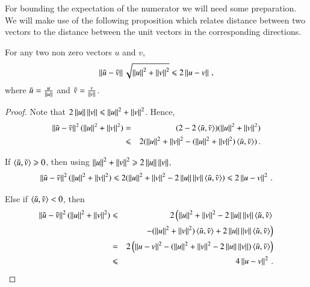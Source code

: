 \documentclass[11pt]{article}
\begin{document}
For bounding the expectation of the numerator we will need some preparation. We will make use of the
following proposition which relates distance between two vectors to the distance between the unit vectors in the corresponding directions.
\begin{proposition}
\label{prop:2vecs}
For any two non zero vectors $u$ and $v$, 
\[ \norm{\tilde{u} - \tilde{v}}  \sqrt{ \norm{u}^2 + \norm{v}^2 }
  \leq 2 \norm{u - v}  \mcom \]
  where $\tilde{u} = \frac{u}{\norm{u}}$ and $\tilde{v} =
  \frac{v}{\norm{v}}$.
\end{proposition}
\begin{proof}
Note that $2\norm{u} \norm{v}  \leq \norm{u}^2 + \norm{v}^2 $.
Hence,
\begin{eqnarray*}
\norm{\tilde{u} - \tilde{v}}^2 ( \norm{u}^2 + \norm{v}^2 )  & =  &
(2 - 2 \inprod{\tilde{u},\tilde{v}}) ( \norm{u}^2 + \norm{v}^2 ) \\
& \leq & 2 ( \norm{u}^2 + \norm{v}^2  -  (\norm{u}^2 + \norm{v}^2)  \inprod{\tilde{u},\tilde{v}}  ) \mper
\end{eqnarray*}

If $\inprod{\tilde{u},\tilde{v}} \geq 0$, then using $ \norm{u}^2 + \norm{v}^2 \geq 2 \norm{u} \norm{v}$,  
\[ \norm{\tilde{u} - \tilde{v}}^2 ( \norm{u}^2 + \norm{v}^2 )  \leq
2 ( \norm{u}^2 + \norm{v}^2  - 2 \norm{u} \norm{v}  \inprod{\tilde{u},\tilde{v}}  ) \leq 2 \norm{u - v}^2 \mper \]

Else if $ \inprod{\tilde{u}, \tilde{v} } < 0$, then
\begin{eqnarray*}
\norm{\tilde{u} - \tilde{v}}^2 ( \norm{u}^2 + \norm{v}^2 )  
& \leq & 2 \left( \norm{u}^2 + \norm{v}^2  - 2 \norm{u} \norm{v}  \inprod{\tilde{u},\tilde{v}}  \right. \\
 && \qquad \left.  - (\norm{u}^2 + \norm{v}^2)  \inprod{\tilde{u},\tilde{v}} + 
  	2 \norm{u} \norm{v}  \inprod{\tilde{u},\tilde{v}} \right) \\
  & = & 2 \left(  \norm{u - v}^2 - (\norm{u}^2 + \norm{v}^2 -  2 \norm{u} \norm{v}  )  \inprod{\tilde{u},\tilde{v}}   \right) \\         
& \leq & 4 \norm{u - v}^2 \mper
\end{eqnarray*}
\end{proof}
\end{document}
